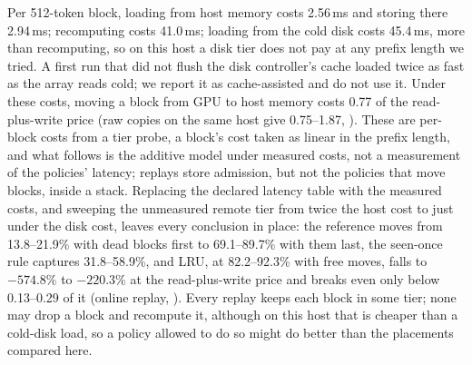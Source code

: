 \medskip
\noindent Per 512-token block, loading from host memory costs 2.56\,ms and storing there 2.94\,ms;
recomputing costs 41.0\,ms; loading from the cold disk costs 45.4\,ms, more than recomputing, so on this
host a disk tier does not pay at any prefix length we tried. A first run that did not flush the disk
controller's cache loaded twice as fast as the array reads cold; we report it as cache-assisted and do
not use it. Under these costs, moving a block from GPU to host memory costs 0.77 of the read-plus-write
price (raw copies on the same host give 0.75--1.87, ). These are per-block costs from a tier probe, a block's cost taken as linear in the prefix length, and
what follows is the additive model under measured costs, not a measurement of the policies' latency;
 replays store admission, but not the policies that move blocks, inside a stack. Replacing the declared latency
table with the measured costs, and sweeping the unmeasured remote tier from twice the host cost to just
under the disk cost, leaves every conclusion in place: the reference
moves from 13.8--21.9\% with dead blocks first to 69.1--89.7\% with them last, the seen-once rule captures
31.8--58.9\%, and LRU, at 82.2--92.3\% with free moves, falls to $-574.8$\% to $-220.3$\% at the
read-plus-write price and breaks even only below 0.13--0.29 of it (online replay, ). Every replay keeps each block in some tier; none may drop a
block and recompute it, although on this host that is cheaper than a cold-disk load, so a policy allowed
to do so might do better than the placements compared here.
